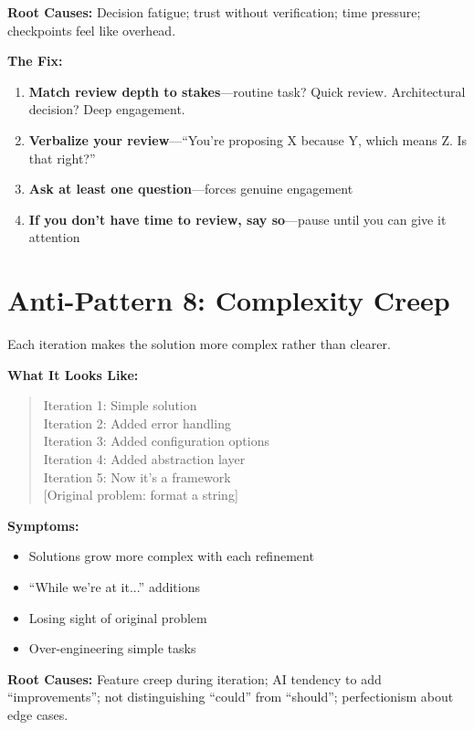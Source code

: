 \textbf{Root Causes:} Decision fatigue; trust without verification; time pressure; checkpoints feel like overhead.

\textbf{The Fix:}
\begin{enumerate}
    \item \textbf{Match review depth to stakes}---routine task? Quick review. Architectural decision? Deep engagement.
    \item \textbf{Verbalize your review}---``You're proposing X because Y, which means Z. Is that right?''
    \item \textbf{Ask at least one question}---forces genuine engagement
    \item \textbf{If you don't have time to review, say so}---pause until you can give it attention
\end{enumerate}

\section{Anti-Pattern 8: Complexity Creep}

Each iteration makes the solution more complex rather than clearer.

\textbf{What It Looks Like:}

\begin{quote}
Iteration 1: Simple solution\\
Iteration 2: Added error handling\\
Iteration 3: Added configuration options\\
Iteration 4: Added abstraction layer\\
Iteration 5: Now it's a framework\\
{[Original problem: format a string]}
\end{quote}

\textbf{Symptoms:}
\begin{itemize}
    \item Solutions grow more complex with each refinement
    \item ``While we're at it...'' additions
    \item Losing sight of original problem
    \item Over-engineering simple tasks
\end{itemize}

\textbf{Root Causes:} Feature creep during iteration; AI tendency to add ``improvements''; not distinguishing ``could'' from ``should''; perfectionism about edge cases.

